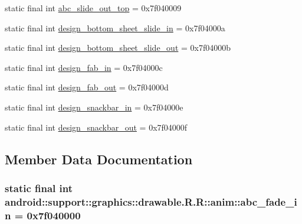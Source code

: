 \begin{CompactItemize}
\item 
static final int \hyperlink{classandroid_1_1support_1_1graphics_1_1drawable_1_1_r_1_1anim_cb6b7db435dc07c23eebb5eeb190647f}{abc\_\-slide\_\-out\_\-top} = 0x7f040009
\item 
static final int \hyperlink{classandroid_1_1support_1_1graphics_1_1drawable_1_1_r_1_1anim_37e3ed072086520522a22d7cfeb9097d}{design\_\-bottom\_\-sheet\_\-slide\_\-in} = 0x7f04000a
\item 
static final int \hyperlink{classandroid_1_1support_1_1graphics_1_1drawable_1_1_r_1_1anim_cc4d4cd1ebfd1cd1ff677f8a68c0c93b}{design\_\-bottom\_\-sheet\_\-slide\_\-out} = 0x7f04000b
\item 
static final int \hyperlink{classandroid_1_1support_1_1graphics_1_1drawable_1_1_r_1_1anim_384e417f1cf8bb433cb05256ae01c981}{design\_\-fab\_\-in} = 0x7f04000c
\item 
static final int \hyperlink{classandroid_1_1support_1_1graphics_1_1drawable_1_1_r_1_1anim_dc8c930fbee0bd02e51394393611ffb1}{design\_\-fab\_\-out} = 0x7f04000d
\item 
static final int \hyperlink{classandroid_1_1support_1_1graphics_1_1drawable_1_1_r_1_1anim_05d5e7f1402121760cf85dd161d2c73d}{design\_\-snackbar\_\-in} = 0x7f04000e
\item 
static final int \hyperlink{classandroid_1_1support_1_1graphics_1_1drawable_1_1_r_1_1anim_17f1b69c89ba3a08d8d21985187d4e03}{design\_\-snackbar\_\-out} = 0x7f04000f
\end{CompactItemize}


\subsection{Member Data Documentation}
\hypertarget{classandroid_1_1support_1_1graphics_1_1drawable_1_1_r_1_1anim_02a3e4fae553a22944f8be5499be9f8f}{
\subsubsection[{abc\_\-fade\_\-in}]{\setlength{\rightskip}{0pt plus 5cm}static final int android::support::graphics::drawable.R.R::anim::abc\_\-fade\_\-in = 0x7f040000}}
\label{classandroid_1_1support_1_1graphics_1_1drawable_1_1_r_1_1anim_02a3e4fae553a22944f8be5499be9f8f}



